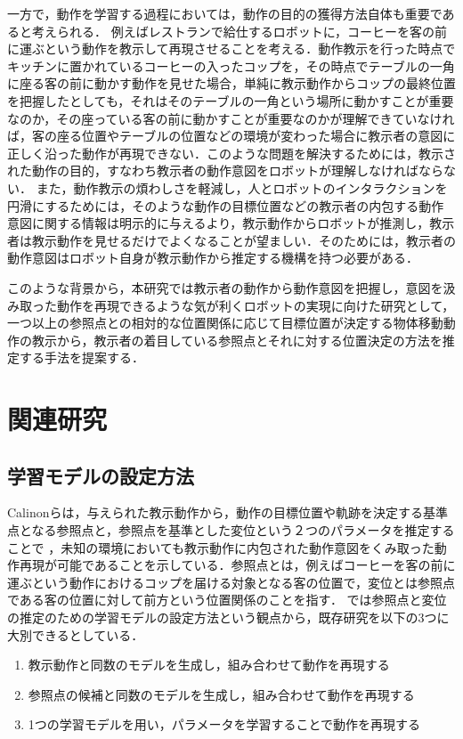 一方で，動作を学習する過程においては，動作の目的の獲得方法自体も重要であると考えられる．
例えばレストランで給仕するロボットに，コーヒーを客の前に運ぶという動作を教示して再現させることを考える．動作教示を行った時点でキッチンに置かれているコーヒーの入ったコップを，その時点でテーブルの一角に座る客の前に動かす動作を見せた場合，単純に教示動作からコップの最終位置を把握したとしても，それはそのテーブルの一角という場所に動かすことが重要なのか，その座っている客の前に動かすことが重要なのかが理解できていなければ，客の座る位置やテーブルの位置などの環境が変わった場合に教示者の意図に正しく沿った動作が再現できない．このような問題を解決するためには，教示された動作の目的，すなわち教示者の動作意図をロボットが理解しなければならない．
また，動作教示の煩わしさを軽減し，人とロボットのインタラクションを円滑にするためには，そのような動作の目標位置などの教示者の内包する動作意図に関する情報は明示的に与えるより，教示動作からロボットが推測し，教示者は教示動作を見せるだけでよくなることが望ましい．そのためには，教示者の動作意図はロボット自身が教示動作から推定する機構を持つ必要がある．

このような背景から，本研究では教示者の動作から動作意図を把握し，意図を汲み取った動作を再現できるような気が利くロボットの実現に向けた研究として，一つ以上の参照点との相対的な位置関係に応じて目標位置が決定する物体移動動作の教示から，教示者の着目している参照点とそれに対する位置決定の方法を推定する手法を提案する．

\section{関連研究}

\subsection{学習モデルの設定方法}

Calinonら\cite{calinon}は，与えられた教示動作から，動作の目標位置や軌跡を決定する基準点となる参照点と，参照点を基準とした変位という２つのパラメータを推定することで
，未知の環境においても教示動作に内包された動作意図をくみ取った動作再現が可能であることを示している．参照点とは，例えばコーヒーを客の前に運ぶという動作におけるコップを届ける対象となる客の位置で，変位とは参照点である客の位置に対して前方という位置関係のことを指す．
\cite{calinon}では参照点と変位の推定のための学習モデルの設定方法という観点から，既存研究を以下の3つに大別できるとしている．

	\begin{enumerate}
		\item 教示動作と同数のモデルを生成し，組み合わせて動作を再現する
		\item 参照点の候補と同数のモデルを生成し，組み合わせて動作を再現する
		\item 1つの学習モデルを用い，パラメータを学習することで動作を再現する
	\end{enumerate}
	
